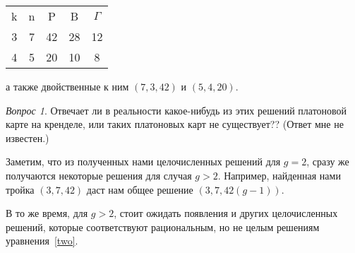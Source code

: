 \documentclass[12pt, a4paper, openany]{amsart}
\theoremstyle{plain}
\theoremstyle{definition}
\theoremstyle{remark}
\newtheorem{que}[theorem]{Вопрос}
\begin{document}
\begin{tabular}{ccc|cc}
	k&n&P&B&$\Gamma$\\	
	3&7&42&28&12\\
	4&5&20&10&8\\			
\end{tabular}

а также двойственные к ним $(7,3,42)$ и $(5,4,20)$.

\begin{que}
	Отвечает ли в реальности какое-нибудь из этих решений платоновой карте на кренделе, или таких платоновых карт не существует?? (Ответ мне не известен.) 
\end{que}

Заметим, что из полученных нами целочисленных решений для $g=2$, сразу же получаются некоторые решения для случая $g>2$. Например, найденная нами тройка
$(3,7,42)$ даст нам общее решение $(3,7,42(g-1))$. 

В то же время, для $g>2$, стоит ожидать появления и других целочисленных решений,
которые соответствуют рациональным, но не целым решениям уравнения~\ref{two}. 

 
 
	
	
\end{document}
